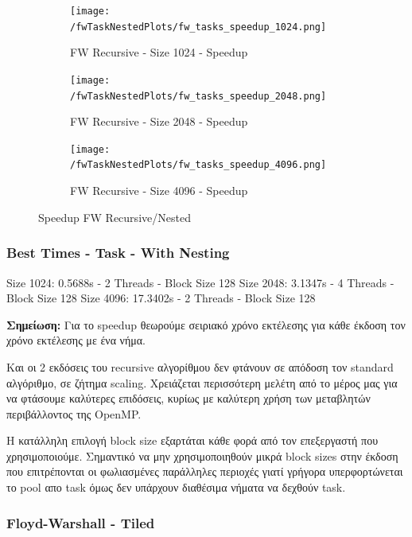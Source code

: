 \documentclass[../final_report.tex]{subfiles}
\begin{document}
\begin{figure}[H]
    \centering
    \begin{subfigure}[b]{0.48\linewidth}
        \texttt{[image: /fwTaskNestedPlots/fw\_tasks\_speedup\_1024.png]}
        \caption{FW Recursive - Size 1024 - Speedup}
    \end{subfigure}
    \begin{subfigure}[b]{0.48\linewidth}
        \texttt{[image: /fwTaskNestedPlots/fw\_tasks\_speedup\_2048.png]}
        \caption{FW Recursive - Size 2048 - Speedup}
    \end{subfigure}
    \begin{subfigure}[b]{0.5\linewidth}
        \texttt{[image: /fwTaskNestedPlots/fw\_tasks\_speedup\_4096.png]}
        \caption{FW Recursive - Size 4096 - Speedup}
    \end{subfigure}
    \caption{Speedup FW Recursive/Nested}
    \label{fig:Speedup FW Recursive/Nested}
\end{figure}

\subsubsection*{Best Times - Task - With Nesting}
Size 1024: 0.5688s - 2 Threads - Block Size 128
\newline
Size 2048: 3.1347s - 4 Threads - Block Size 128
\newline
Size 4096: 17.3402s - 2 Threads - Block Size 128
\newline

\textbf{Σημείωση:} Για το speedup θεωρούμε σειριακό χρόνο εκτέλεσης για κάθε έκδοση τον χρόνο εκτέλεσης
με ένα νήμα. 

\vspace{4pt}

Και οι 2 εκδόσεις του recursive αλγορίθμου δεν φτάνουν σε απόδοση τον standard αλγόριθμο, σε ζήτημα scaling.
Χρειάζεται περισσότερη μελέτη από το μέρος μας για να φτάσουμε καλύτερες επιδόσεις, κυρίως
με καλύτερη χρήση των μεταβλητών περιβάλλοντος της OpenMP.

Η κατάλληλη επιλογή block size εξαρτάται κάθε φορά από τον επεξεργαστή που χρησιμοποιούμε.
Σημαντικό να μην χρησιμοποιηθούν μικρά block sizes στην έκδοση που επιτρέπονται οι φωλιασμένες
παράλληλες περιοχές γιατί γρήγορα υπερφορτώνεται το pool απο task όμως δεν υπάρχουν
διαθέσιμα νήματα να δεχθούν task.


\subsubsection{Floyd-Warshall - Tiled}
\end{document}
